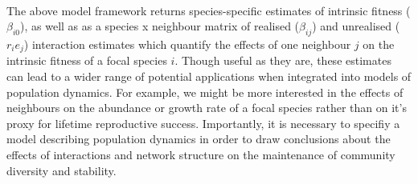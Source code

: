 \documentclass[a4,12pt]{article}
\begin{document}
        \paragraph{}
        The above model framework returns species-specific estimates of intrinsic fitness ($\beta_{i0}$), as well as as a species x neighbour matrix of realised ($\beta_{ij}$) and unrealised ($r_i e_j$) interaction estimates which quantify the effects of one neighbour $j$ on the intrinsic fitness of a focal species $i$. Though useful as they are, these estimates can lead to a wider range of potential applications when integrated into models of population dynamics. For example, we might be more interested in the effects of neighbours on the abundance or growth rate of a focal species rather than on it's proxy for lifetime reproductive success. Importantly, it is necessary to specifiy a model describing population dynamics in order to draw conclusions about the effects of interactions and network structure on the maintenance of community diversity and stability. 
\end{document}
